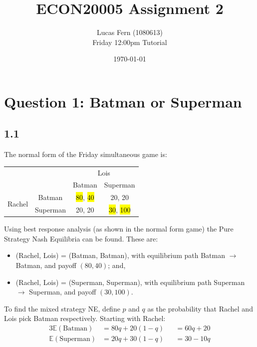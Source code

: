 \documentclass{article}
\title{\vspace{-2cm}ECON20005 Assignment 2}
\date{\today}
\author{Lucas Fern (1080613)\\Friday 12:00pm Tutorial}
\newcommand{\E}[1]{\mathbb{E}(\mbox{#1})}
\begin{document}
\maketitle
\section*{Question 1: Batman or Superman}
\subsection*{1.1}
The normal form of the Friday simultaneous game is:
\begin{table}[H]
    \centering
    \begin{tabular}{@{}cccc@{}}
                                                 &                               & \multicolumn{2}{c}{Lois}                                    \\ \cmidrule(l){3-4} 
                                                 & \multicolumn{1}{c|}{}         & \multicolumn{1}{c|}{Batman} & \multicolumn{1}{c|}{Superman} \\ \cmidrule(l){2-4} 
    \multicolumn{1}{c|}{\multirow{2}{*}{Rachel}} & \multicolumn{1}{c|}{Batman}   & \multicolumn{1}{c|}{\hl{80}, \hl{40}} & \multicolumn{1}{c|}{20, 20}   \\ \cmidrule(l){2-4} 
    \multicolumn{1}{c|}{}                        & \multicolumn{1}{c|}{Superman} & \multicolumn{1}{c|}{20, 20} & \multicolumn{1}{c|}{\hl{30}, \hl{100}}  \\ \cmidrule(l){2-4} 
    \end{tabular}
\end{table}
\noindent Using best response analysis (as shown in the normal form game) the Pure Strategy Nash Equilibria can be found. These are:
\begin{itemize}
    \item (Rachel, Lois) = (Batman, Batman), with equilibrium path Batman $\longrightarrow$ Batman, and payoff $(80, 40)$; and,
    \item (Rachel, Lois) = (Superman, Superman), with equilibrium path Superman $\longrightarrow$ Superman, and payoff $(30, 100)$.
\end{itemize}
To find the mixed strategy NE, define $p$ and $q$ as the probability that Rachel and Lois pick Batman respectively. Starting with Rachel:
\begin{alignat}{3}
    \E{Batman} &= 80q + 20(1-q) &&= 60q + 20\\
    \E{Superman} &= 20q + 30(1-q) &&= 30 - 10q
\end{alignat}
\end{document}
